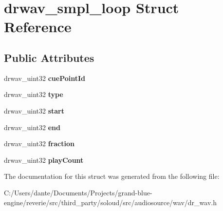 \hypertarget{structdrwav__smpl__loop}{}\section{drwav\+\_\+smpl\+\_\+loop Struct Reference}
\label{structdrwav__smpl__loop}
\subsection*{Public Attributes}
\begin{DoxyCompactItemize}
\item 
\mbox{\label{structdrwav__smpl__loop_a494799db87ae8d4ff075f1283cabca0f}} 
drwav\+\_\+uint32 {\bfseries cue\+Point\+Id}
\item 
\mbox{\label{structdrwav__smpl__loop_a920eae2dd73283716ed3a3ccd90e5ec2}} 
drwav\+\_\+uint32 {\bfseries type}
\item 
\mbox{\label{structdrwav__smpl__loop_a573a4644042d63189fc9420053ed031e}} 
drwav\+\_\+uint32 {\bfseries start}
\item 
\mbox{\label{structdrwav__smpl__loop_a2b2de7e23e94ba275296d9b6ae8c3db6}} 
drwav\+\_\+uint32 {\bfseries end}
\item 
\mbox{\label{structdrwav__smpl__loop_afc450d1301cff73d5052e508f513b544}} 
drwav\+\_\+uint32 {\bfseries fraction}
\item 
\mbox{\label{structdrwav__smpl__loop_acbde654bad7680c6b8ef01cbd7b3a7b7}} 
drwav\+\_\+uint32 {\bfseries play\+Count}
\end{DoxyCompactItemize}


The documentation for this struct was generated from the following file\+:\begin{DoxyCompactItemize}
\item 
C\+:/\+Users/dante/\+Documents/\+Projects/grand-\/blue-\/engine/reverie/src/third\+\_\+party/soloud/src/audiosource/wav/dr\+\_\+wav.\+h\end{DoxyCompactItemize}
